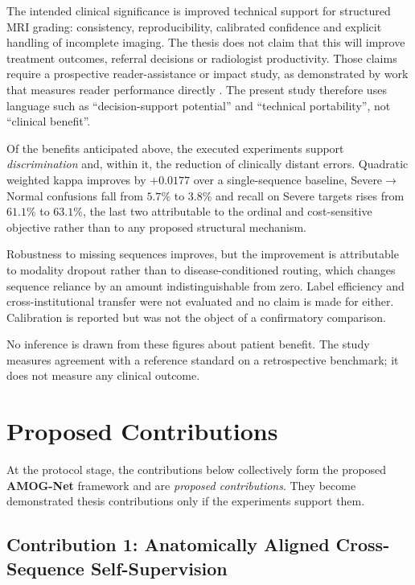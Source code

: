 The intended clinical significance is improved technical support for structured MRI
grading: consistency, reproducibility, calibrated confidence and explicit handling
of incomplete imaging. The thesis does not claim that this will improve treatment
outcomes, referral decisions or radiologist productivity. Those claims require a
prospective reader-assistance or impact study, as demonstrated by work that measures
reader performance directly \cite{lim2022improved}. The present study therefore
uses language such as ``decision-support potential'' and ``technical portability'',
not ``clinical benefit''.

Of the benefits anticipated above, the executed experiments support
\emph{discrimination} and, within it, the reduction of clinically distant
errors. Quadratic weighted kappa improves by $+0.0177$ over a single-sequence
baseline, Severe$\rightarrow$Normal confusions fall from $5.7\%$ to $3.8\%$ and
recall on Severe targets rises from $61.1\%$ to $63.1\%$, the last two
attributable to the ordinal and cost-sensitive objective rather than to any
proposed structural mechanism.

Robustness to missing sequences improves, but the improvement is attributable to
modality dropout rather than to disease-conditioned routing, which changes
sequence reliance by an amount indistinguishable from zero. Label efficiency and
cross-institutional transfer were not evaluated and no claim is made for either.
Calibration is reported but was not the object of a confirmatory comparison.

No inference is drawn from these figures about patient benefit. The study
measures agreement with a reference standard on a retrospective benchmark; it
does not measure any clinical outcome.

\section{Proposed Contributions}
\label{sec:intro-contributions}

At the protocol stage, the contributions below collectively form the proposed \textbf{AMOG-Net} framework and are \emph{proposed contributions}.
They become demonstrated thesis contributions only if the experiments support them.

\subsection{Contribution 1: Anatomically Aligned Cross-Sequence Self-Supervision}
\label{sec:intro-contrib-ssl}

